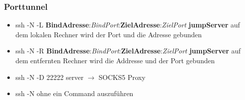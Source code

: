 \begin{frame}
\frametitle{Porttunnel}
\begin{itemize}
\item ssh -N -L \textbf{BindAdresse}:\textit{BindPort}:\textbf{ZielAdresse}:\textit{ZielPort} \textbf{jumpServer} auf dem lokalen Rechner wird der Port und die Adresse gebunden
\pause
\item ssh -N -R \textbf{BindAdresse}:\textit{BindPort}:\textbf{ZielAdresse}:\textit{ZielPort} \textbf{jumpServer} auf dem entfernten Rechner wird die Addresse und der Port gebunden
\pause
\item ssh -N -D 22222 server 	$\rightarrow$ SOCKS5 Proxy
\pause
\item ssh -N ohne ein Command auszuführen
\end{itemize}
\end{frame}